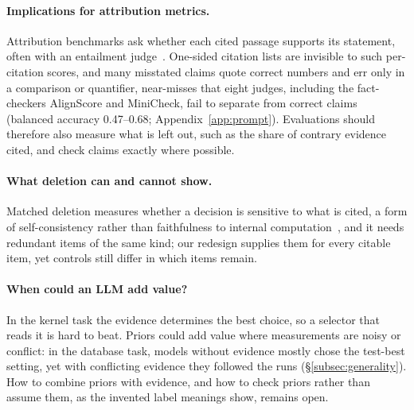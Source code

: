 \paragraph{Implications for attribution metrics.}
Attribution benchmarks ask whether each cited passage supports its statement, often with an entailment judge~\cite{Rashkin2023AIS,Gao2023ALCE}. One-sided citation lists are invisible to such per-citation scores, and many misstated claims quote correct numbers and err only in a comparison or quantifier, near-misses that eight judges, including the fact-checkers AlignScore and MiniCheck, fail to separate from correct claims (balanced accuracy 0.47--0.68; Appendix~\ref{app:prompt}). Evaluations should therefore also measure what is left out, such as the share of contrary evidence cited, and check claims exactly where possible.

\paragraph{What deletion can and cannot show.}
Matched deletion measures whether a decision is sensitive to what is cited, a form of self-consistency rather than faithfulness to internal computation~\cite{Parcalabescu2024SelfConsistency}, and it needs redundant items of the same kind; our redesign supplies them for every citable item, yet controls still differ in which items remain.

\paragraph{When could an LLM add value?}
In the kernel task the evidence determines the best choice, so a selector that reads it is hard to beat. Priors could add value where measurements are noisy or conflict: in the database task, models without evidence mostly chose the test-best setting, yet with conflicting evidence they followed the runs (\S\ref{subsec:generality}). How to combine priors with evidence, and how to check priors rather than assume them, as the invented label meanings show, remains open.
